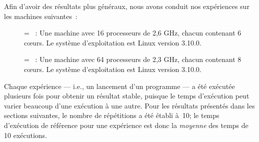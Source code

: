 

\goodbreak
\begin{samepage}
Afin d'avoir des r\'esultats plus g\'en\'eraux, nous avons conduit nos exp\'eriences sur les machines suivantes~:
\label{machines.sect}



\begin{description}
\item[] = ~: Une machine avec 16 processeurs de 2,6 GHz, chacun contenant 6 cœurs. Le syst\`eme d'exploitation est Linux version 3.10.0. 


\item[] = ~:  Une machine avec 64 processeurs de 2,3 GHz, chacun contenant 8 cœurs. Le système d'exploitation est Linux version 3.10.0.


\end{description}
\end{samepage}




Chaque exp\'erience --- i.e., un lancement d'un programme --- a \'et\'e ex\'ecut\'ee plusieurs fois pour obtenir un r\'esultat stable, puisque le temps d'ex\'ecution peut varier beaucoup d'une ex\'ecution \`a une autre. 
%
Pour les r\'esultats pr\'esent\'es dans les sections suivantes, le nombre de r\'ep\'etitions a \'et\'e \'etabli \`a~10; le temps d'ex\'ecution de r\'ef\'erence pour une exp\'erience est donc la \emph{moyenne} des temps de 10 ex\'ecutions.


